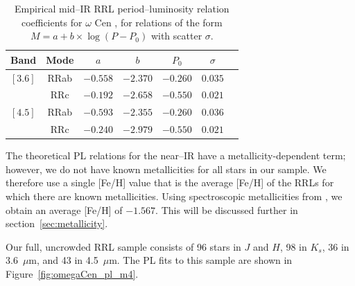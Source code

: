\documentclass[a4paper,fleqn,usenatbib]{mnras}
\begin{document}
\begin{table}
\centering
\caption{Empirical mid--IR RRL period--luminosity relation coefficients for $\omega$ Cen \citep{2015arXiv150507858N}, for relations of the form $M = a + b \times \log (P - P_0)$ with scatter $\sigma$.} 
\label{tab:pl_table_m4}
\begin{tabular}{l||c|c|c|c|c|r} 
\hline \hline
Band & Mode & $a$ & $b$ & $P_0$ & $\sigma$ \\
\hline
$[3.6]$ & RRab & $-0.558$ & $-2.370$ & $-0.260$ & $0.035$ \\
            & RRc & $-0.192$ & $-2.658$ & $-0.550$ & $0.021$ \\
$[4.5]$ & RRab & $-0.593$ & $-2.355$ & $-0.260$ & $0.036$ \\
            & RRc & $-0.240$ & $-2.979$ & $-0.550$ & $0.021$ \\ 
            \hline
\end{tabular}
\end{table}


The theoretical PL relations for the near--IR have a metallicity-dependent term; however, we do not have known metallicities for all stars in our sample. We therefore use a single [Fe/H] value that is the average [Fe/H] of the RRLs for which there are known metallicities. Using spectroscopic metallicities from \citet{2006ApJ...640L..43S}, we obtain an average [Fe/H] of $-1.567$. This will be discussed further in section~\ref{sec:metallicity}.



Our full, uncrowded RRL sample consists of 96 stars in $J$ and $H$, 98 in $K_s$, 36 in 3.6~$\mu$m, and 43 in 4.5~$\mu$m. The PL fits to this sample are shown in Figure~\ref{fig:omegaCen_pl_m4}.
\end{document}
